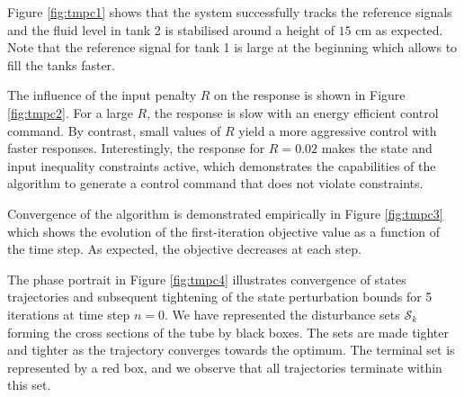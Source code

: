 \documentclass[letterpaper, 10 pt, conference]{ieeeconf}
\begin{document}
Figure \ref{fig:tmpc1} shows that the system successfully tracks the reference signals and the fluid level in tank 2 is stabilised around a height of $15$ cm as expected. Note that the reference signal for tank 1 is large at the beginning which allows to fill the tanks faster. 

The influence of the input penalty $R$ on the response is shown in Figure \ref{fig:tmpc2}. For a large $R$, the response is slow with an energy efficient control command. By contrast, small values of $R$ yield a more aggressive control with faster responses. Interestingly, the response for $R=0.02$ makes the state and input inequality constraints active, which demonstrates the capabilities of the algorithm to generate a control command that does not violate constraints. 


Convergence of the algorithm is demonstrated empirically in Figure \ref{fig:tmpc3} which shows the evolution of the first-iteration objective value as a function of the time step. As expected, the objective decreases at each step. 

The phase portrait in Figure \ref{fig:tmpc4} illustrates convergence of states trajectories and subsequent tightening of the state perturbation bounds for 5 iterations at time step $n=0$. We have represented the disturbance sets $\mathcal{S}_k$ forming the cross sections of the tube by black boxes. The sets are made tighter and tighter as the trajectory converges towards the optimum. The terminal set is represented by a red  box, and we observe that all trajectories terminate within this set. 
\end{document}
